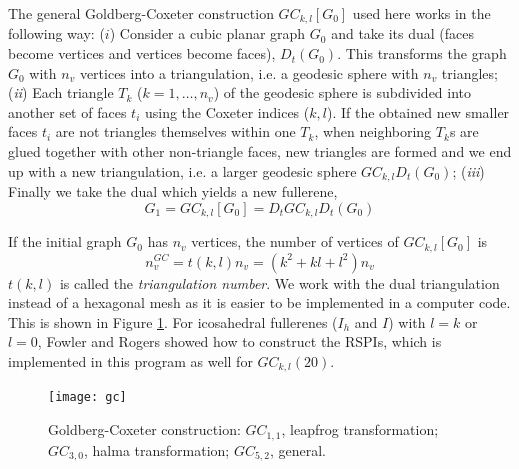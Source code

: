\documentclass[article,a4paper,twoside]{memoir}
\begin{document}
The general Goldberg-Coxeter construction $GC_{k,l}[G_{0}]$ used here works in the following way: ($i$) Consider
a cubic planar graph $G_{0}$ and take its dual (faces become vertices and
vertices become faces), $D_{t}(G_{0})$. This transforms the graph $G_{0}$
with $n_v$ vertices into a triangulation, i.e. a geodesic sphere with $n_v$ triangles; (\textit{ii})
Each triangle $T_{k}$ ($k=1, \dots, n_{v}$) of the geodesic sphere is
subdivided into another set of faces $t_i$ using the Coxeter indices ($k,l$).
If the obtained new smaller faces $t_i$ are not
triangles themselves within one $T_k$, when neighboring $T_k$s are glued
together with other non-triangle faces, new triangles are formed and we end up with a new triangulation,
i.e. a larger geodesic sphere $GC_{k,l}D_{t}(G_{0})$;
(\textit{iii}) Finally we take the dual which yields a new fullerene,
\begin{equation}
 	G_1 = GC_{k,l}[G_0] = D_t GC_{k,l} D_t(G_0)
	\label{eq:GC}
\end{equation}

If the initial graph $G_0$ has $n_v$ vertices, the number of vertices of $GC_{k,l}[G_0]$ is
\begin{equation}
	n_v^{GC} = t(k,l)n_v = (k^2 + kl + l^2)n_v
	\label{eq:GCvertexcount} 
\end{equation}
$t(k,l)$ is called the {\em triangulation number}. We work with the dual triangulation instead of a hexagonal mesh as it is easier to be implemented in a computer code.
This is shown in Figure \ref{pic:GoldbergCoxeter}. For icosahedral fullerenes ($I_h$ and $I$) with $l = k$ or $l = 0$, Fowler and Rogers 
showed how to construct the RSPIs,\cite{Rogers} which is implemented in this program as well for $GC_{k,l}(20)$.

 \begin{figure}[htbp]
   	\centering
  	\texttt{[image: gc]}
    \caption{Goldberg-Coxeter construction: $GC_{1,1}$, leapfrog transformation; $GC_{3,0}$, halma transformation; $GC_{5,2}$, general.}
	\label{pic:GoldbergCoxeter}
 \end{figure}


\end{document}
